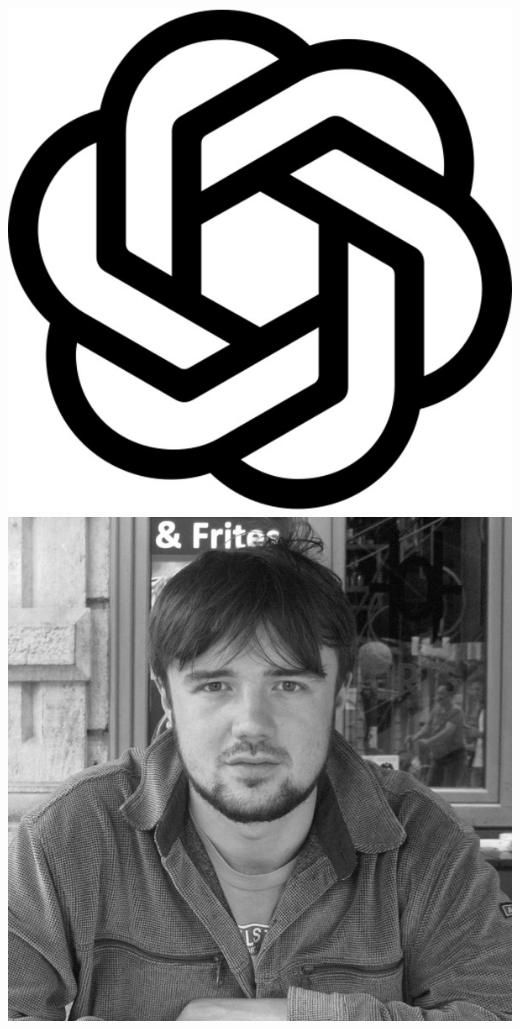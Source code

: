 \documentclass[aspectratio=169]{beamer}
\begin{document}
\begin{frame}
{        \includegraphics[width=0.06\textheight]{people/openai.jpg}%
        \includegraphics[width=0.06\textheight]{people/sam_leeney.jpg}%
}
\end{frame}
\end{document}
